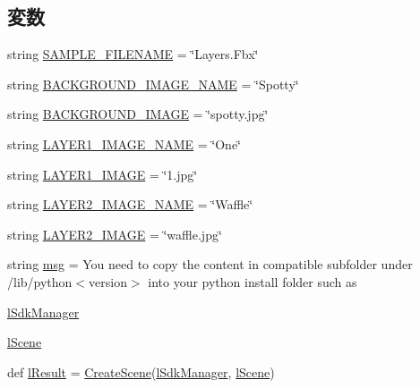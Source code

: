 \subsection*{変数}
\begin{DoxyCompactItemize}
\item 
string \hyperlink{namespace_layers_a880944a413b5f70eb7a58f4a25ea1c59}{S\+A\+M\+P\+L\+E\+\_\+\+F\+I\+L\+E\+N\+A\+ME} = \char`\"{}Layers.\+Fbx\char`\"{}
\item 
string \hyperlink{namespace_layers_a23b2005a9d6cc167017b1b8584d39550}{B\+A\+C\+K\+G\+R\+O\+U\+N\+D\+\_\+\+I\+M\+A\+G\+E\+\_\+\+N\+A\+ME} = \char`\"{}Spotty\char`\"{}
\item 
string \hyperlink{namespace_layers_afb15a9755945901420de60df6f679122}{B\+A\+C\+K\+G\+R\+O\+U\+N\+D\+\_\+\+I\+M\+A\+GE} = \char`\"{}spotty.\+jpg\char`\"{}
\item 
string \hyperlink{namespace_layers_a9079c00a1857dcad339311b140496ba0}{L\+A\+Y\+E\+R1\+\_\+\+I\+M\+A\+G\+E\+\_\+\+N\+A\+ME} = \char`\"{}One\char`\"{}
\item 
string \hyperlink{namespace_layers_a690a3ef48d5a8f9271fbded9bbcdac29}{L\+A\+Y\+E\+R1\+\_\+\+I\+M\+A\+GE} = \char`\"{}1.jpg\char`\"{}
\item 
string \hyperlink{namespace_layers_a9211fc4d42f84ee00e17ed221bf23dc9}{L\+A\+Y\+E\+R2\+\_\+\+I\+M\+A\+G\+E\+\_\+\+N\+A\+ME} = \char`\"{}Waffle\char`\"{}
\item 
string \hyperlink{namespace_layers_a1b10302c74d034adff1624b5a6f98fdc}{L\+A\+Y\+E\+R2\+\_\+\+I\+M\+A\+GE} = \char`\"{}waffle.\+jpg\char`\"{}
\item 
string \hyperlink{namespace_layers_a1f6ae2aaacbdc93fbcade32f3c33f43d}{msg} = \textquotesingle{}You need to copy the content in compatible subfolder under /lib/python$<$version$>$ into your python install folder such as \textquotesingle{}
\item 
\hyperlink{namespace_layers_a1f57249d5ca09889d5b82869555d95f5}{l\+Sdk\+Manager}
\item 
\hyperlink{namespace_layers_a321f9eac266d279b83e9e71b0886c249}{l\+Scene}
\item 
def \hyperlink{namespace_layers_a8cbda7938d4f5055fce6038828aa1739}{l\+Result} = \hyperlink{namespace_layers_a309c2ef4c98c67e113f0a309920375b1}{Create\+Scene}(\hyperlink{namespace_layers_a1f57249d5ca09889d5b82869555d95f5}{l\+Sdk\+Manager}, \hyperlink{namespace_layers_a321f9eac266d279b83e9e71b0886c249}{l\+Scene})
\end{DoxyCompactItemize}



